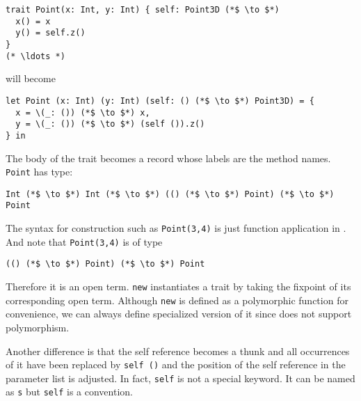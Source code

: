 \begin{lstlisting}
trait Point(x: Int, y: Int) { self: Point3D (*$ \to $*)
  x() = x
  y() = self.z()
}
(* \ldots *)
\end{lstlisting}

will become

\begin{lstlisting}
let Point (x: Int) (y: Int) (self: () (*$ \to $*) Point3D) = {
  x = \(_: ()) (*$ \to $*) x,
  y = \(_: ()) (*$ \to $*) (self ()).z()
} in
\end{lstlisting}

The body of the trait becomes a record whose labels are the method names.
\lstinline$Point$ has type:

\begin{lstlisting}
Int (*$ \to $*) Int (*$ \to $*) (() (*$ \to $*) Point) (*$ \to $*) Point
\end{lstlisting}

The syntax for construction such as \lstinline$Point(3,4)$ is just function
application in \name. And note that \lstinline$Point(3,4)$ is of type
\begin{lstlisting}
(() (*$ \to $*) Point) (*$ \to $*) Point
\end{lstlisting}
Therefore it is an open term. \lstinline$new$ instantiates a trait by taking the
fixpoint of its corresponding open term. Although \lstinline$new$ is defined as
a polymorphic function for convenience, we can always define specialized version
of it since \name does not support polymorphism.

Another difference is that the self reference becomes a thunk and all
occurrences of it have been replaced by \lstinline$self ()$ and the position of
the self reference in the parameter list is adjusted. In fact, \lstinline$self$
is not a special keyword. It can be named as \lstinline$s$ but \lstinline$self$
is a convention.

